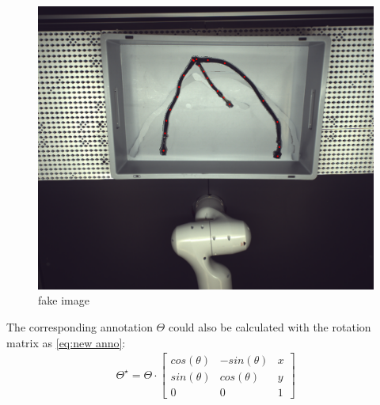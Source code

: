	\begin{figure}
		\centering
		\includegraphics[width=0.6\linewidth]{example_images/img_0_segment_fakeImages}
		\caption{fake image}
		\label{fig:fake image}
	\end{figure}
	The corresponding annotation $\Theta $ could also be calculated with the rotation matrix as \autoref{eq:new anno}:
	\begin{align}
		\Theta ^{\star } = \Theta \cdot \begin{bmatrix}
			cos(\theta)&  -sin(\theta )&x \\
			sin(\theta )&  cos(\theta )&y  \\
			0&  0&1
		\end{bmatrix} \label{eq:new anno}
	\end{align}

